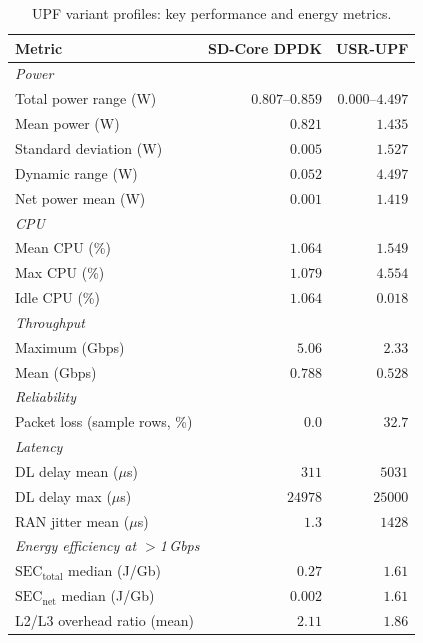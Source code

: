 \documentclass[12pt, a4paper]{report}
\newcommand{\sectable}{$\mathrm{SEC}_{\mathrm{total}}$}
\newcommand{\secnet}{$\mathrm{SEC}_{\mathrm{net}}$}
\begin{document}
\begin{table}[htbp]
  \centering
  \caption{UPF variant profiles: key performance and energy metrics.}
  \label{tab:profiles}
  \setlength{\tabcolsep}{7pt}
  \begin{tabular}{lrr}
    \toprule
    \textbf{Metric} & \textbf{SD-Core DPDK} & \textbf{USR-UPF} \\
    \midrule
    \multicolumn{3}{l}{\textit{Power}} \\
    \quad Total power range (W)         & $0.807$--$0.859$ & $0.000$--$4.497$ \\
    \quad Mean power (W)                & $0.821$           & $1.435$           \\
    \quad Standard deviation (W)        & $0.005$           & $1.527$           \\
    \quad Dynamic range (W)             & $0.052$           & $4.497$           \\
    \quad Net power mean (W)            & $0.001$           & $1.419$           \\
    \midrule
    \multicolumn{3}{l}{\textit{CPU}} \\
    \quad Mean CPU (\%)                 & $1.064$           & $1.549$           \\
    \quad Max CPU (\%)                  & $1.079$           & $4.554$           \\
    \quad Idle CPU (\%)                 & $1.064$           & $0.018$           \\
    \midrule
    \multicolumn{3}{l}{\textit{Throughput}} \\
    \quad Maximum (Gbps)                & $5.06$            & $2.33$            \\
    \quad Mean (Gbps)                   & $0.788$           & $0.528$           \\
    \midrule
    \multicolumn{3}{l}{\textit{Reliability}} \\
    \quad Packet loss (sample rows, \%) & $0.0$             & $32.7$            \\
    \midrule
    \multicolumn{3}{l}{\textit{Latency}} \\
    \quad DL delay mean ($\mu$s)  & $311$      & $5031$            \\
    \quad DL delay max ($\mu$s)   & $24978$    & $25000$           \\
    \quad RAN jitter mean ($\mu$s) & $1.3$     & $1428$            \\
    \midrule
    \multicolumn{3}{l}{\textit{Energy efficiency at $>$1\,Gbps}} \\
    \quad \sectable{} median (J/Gb)     & $0.27$            & $1.61$            \\
    \quad \secnet{} median (J/Gb)       & $0.002$           & $1.61$            \\
    \midrule
    L2/L3 overhead ratio (mean)         & $2.11$            & $1.86$            \\
    \bottomrule
  \end{tabular}
\end{table}
\end{document}
